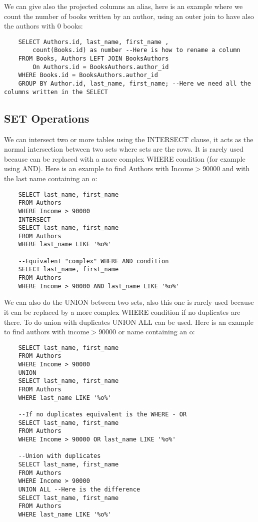 \documentclass[a4page, 11pt]{article}
\begin{document}
We can give also the projected columns an alias, here is an example where we count the number of books written by an author, using an outer join to have also the authors with 0 books:
\begin{lstlisting}
	SELECT Authors.id, last_name, first_name ,
		count(Books.id) as number --Here is how to rename a column
	FROM Books, Authors LEFT JOIN BooksAuthors
		On Authors.id = BooksAuthors.author_id
	WHERE Books.id = BooksAuthors.author_id
	GROUP BY Author.id, last_name, first_name; --Here we need all the columns written in the SELECT
\end{lstlisting}
\pagebreak
\subsection{SET Operations}
We can intersect two or more tables using the INTERSECT clause, it acts as the normal intersection between two sets where sets are the rows. 
It is rarely used because can be replaced with a more complex WHERE condition (for example using AND). 
Here is an example to find Authors with Income$>$90000 and with the last name containing an o:
\begin{lstlisting}
	SELECT last_name, first_name
	FROM Authors
	WHERE Income > 90000
	INTERSECT 
	SELECT last_name, first_name
	FROM Authors
	WHERE last_name LIKE '%o%' 
	
	--Equivalent "complex" WHERE AND condition
	SELECT last_name, first_name
	FROM Authors
	WHERE Income > 90000 AND last_name LIKE '%o%'
\end{lstlisting}
We can also do the UNION between two sets, also this one is rarely used because it can be replaced by a more complex WHERE condition if no duplicates are there. To do union with duplicates UNION ALL can be used. 
Here is an example to find authors with income$>$90000 or name containing an o:
\begin{lstlisting}
	SELECT last_name, first_name
	FROM Authors
	WHERE Income > 90000
	UNION 
	SELECT last_name, first_name
	FROM Authors
	WHERE last_name LIKE '%o%' 
	
	--If no duplicates equivalent is the WHERE - OR
	SELECT last_name, first_name
	FROM Authors
	WHERE Income > 90000 OR last_name LIKE '%o%'
	
	--Union with duplicates
	SELECT last_name, first_name
	FROM Authors
	WHERE Income > 90000
	UNION ALL --Here is the difference
	SELECT last_name, first_name
	FROM Authors
	WHERE last_name LIKE '%o%' 
\end{lstlisting}
\end{document}
